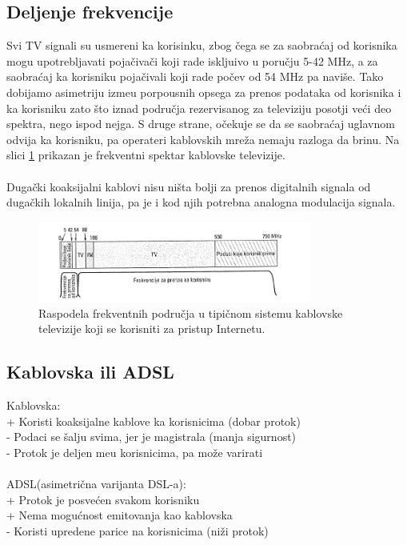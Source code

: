 \documentclass{article} %
\begin{document}
\subsection{Deljenje frekvencije}

Svi TV signali su usmereni ka korisinku, zbog \v cega se za saobra\' caj od korisnika mogu upotrebljavati poja\v civa\v ci koji rade iskljuivo u poru\v cju 5-42 MHz, a za saobra\' caj ka korisniku poja\v civali koji rade po\v cev od 54 MHz pa navi\v se. Tako dobijamo asimetriju izme\dj u porpousnih opsega za prenos podataka od korisnika i ka korisniku zato \v sto iznad podru\v cja rezervisanog za televiziju posotji ve\' ci deo spektra, nego ispod nejga. S druge strane, o\v cekuje se da se saobra\' caj uglavnom odvija ka korisniku, pa operateri kablovskih mre\v za nemaju razloga da brinu. Na slici \ref{frekventni spektar} prikazan je frekventni spektar kablovske televizije.
\\
\\ Duga\v cki koaksijalni kablovi nisu ni\v sta bolji za prenos digitalnih signala od duga\v ckih lokalnih linija, pa je i kod njih potrebna analogna modulacija signala. 

\begin{figure}[H]
	\centering
	\includegraphics[width=0.8\textwidth]{slike-aplikativniSloj/frekvencije.png}
	\caption{Raspodela frekventnih podru\v cja u tipi\v cnom sistemu kablovske televizije koji se korisniti za pristup Internetu.}
	\label{frekventni spektar}
\end{figure}

\subsection{Kablovska ili ADSL}

\noindent Kablovska:
\\+ Koristi koaksijalne kablove ka korisnicima (dobar protok)
\\- Podaci se \v salju svima, jer je magistrala (manja sigurnost)
\\- Protok je deljen me\dj u korisnicima, pa mo\v ze varirati
\\
\\ ADSL(asimetri\v cna varijanta DSL-a):
\\ + Protok je posve\' cen svakom korisniku
\\ + Nema mogu\' cnost emitovanja kao kablovska
\\ - Koristi upredene parice na korisnicima (ni\v zi protok)
\end{document}
